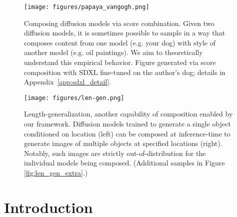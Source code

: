 \begin{figure}[!ht]
\vskip 0.2in
\begin{center}
\centerline{\texttt{[image: figures/papaya\_vangogh.png]}}
\caption{Composing diffusion models via score combination.
Given two diffusion models, it is sometimes
possible to sample in a way that
composes content from one model (e.g. your dog) 
with style of another model (e.g. oil paintings). We aim to theoretically understand this empirical behavior.
Figure generated via score composition
with SDXL fine-tuned on the author's dog; details in Appendix~\ref{app:sdxl_detail}.
}
\label{fig:style-content}
\end{center}
\vskip -0.2in
\end{figure}
\begin{figure}[!htb]
\vskip 0.1in
\begin{center}
\centerline{\texttt{[image: figures/len-gen.png]}}
\caption{Length-generalization, another capability of composition enabled by our framework. Diffusion models trained to generate a single object conditioned on location (left) can be composed at inference-time to generate images
of multiple objects at specified locations (right).
Notably, such images are strictly out-of-distribution
for the individual models being composed. (Additional samples in Figure \ref{fig:len_gen_extra}.)
}
\label{fig:len_gen}
\end{center}
\vskip -0.3in
\end{figure}

\section{Introduction}

